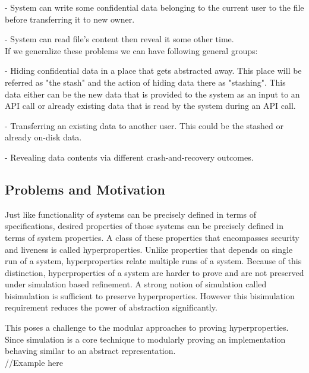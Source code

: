 \documentclass[onecolumn]{paper}
\begin{document}
- System can write some confidential data belonging to the current user 
	to the file before transferring it to new owner.
	
- System can read file's content then reveal it some other time.\\

If we generalize these problems we can have following general groups:

- Hiding confidential data in a place that gets abstracted away.
This place will be referred as "the stash" and the action of hiding data there as "stashing". This data either can be the new data that is provided to the system as an input to an API call or already existing data that is read by the system during an API call.

- Transferring an existing data to another user. This could be the stashed or already on-disk data.

- Revealing data contents via different crash-and-recovery outcomes.


\subsection*{Problems and Motivation}
Just like functionality of systems can be precisely defined in terms of specifications, desired properties of those systems can be precisely defined in terms of system properties. A class of these properties that encompasses security and liveness is called hyperproperties. Unlike properties that depends on single run of a system, hyperproperties relate multiple runs of a system. Because of this distinction, hyperproperties of a system are harder to prove and are not preserved under simulation based refinement. A strong notion of simulation called bisimulation is sufficient to preserve hyperproperties. However this bisimulation requirement reduces the power of abstraction significantly.

This poses a challenge to the modular approaches to proving hyperproperties. Since simulation is a core technique to modularly proving an implementation behaving similar to an abstract representation.\\

//Example here\\
\end{document}
